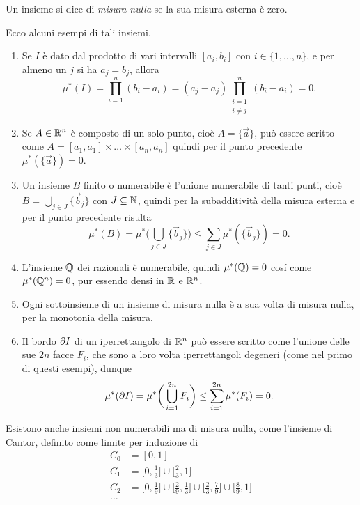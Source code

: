 Un insieme si dice di \emph{misura nulla} se la sua misura esterna è zero.
\begin{esempio} \label{es:insiemi-misura-nulla}
	Ecco alcuni esempi di tali insiemi.
	\begin{enumerate}
		\item Se $I$ è dato dal prodotto di vari intervalli $[a_i,b_i]$ con $i\in\{1,\dots,n\}$, e per almeno un $j$ si ha $a_j=b_j$, allora
			\begin{equation}
				\mu^*(I)=\prod_{i=1}^n(b_i-a_i)=(a_j-a_j)\prod_{\substack{i=1\\i\neq j}}^n(b_i-a_i)=0.
			\end{equation}
		\item Se $A\in\mathbb{R}^n$ è composto di un solo punto, cioè $A=\{\vec a\}$, può essere scritto come $A=[a_1,a_1]\times\dots\times[a_n,a_n]$ quindi per il punto precedente $\mu^*(\{\vec a\})=0$.
		\item Un insieme $B$ finito o numerabile è l'unione numerabile di tanti punti, cioè $B=\bigcup_{j\in J}\{\vec b_j\}$ con $J\subseteq\mathbb{N}$, quindi per la subadditività della misura esterna e per il punto precedente risulta
			\begin{equation}
				\mu^*(B)=\mu^*\bigg(\bigcup_{j\in J}\{\vec b_j\}\bigg)\leq\sum_{j\in J}\mu^*(\{\vec b_j\})=0.
			\end{equation}
		\item L'insieme $\mathbb{Q}$ dei razionali è numerabile, quindi $\mu^*(\mathbb{Q})=0$ cos\'i come $\mu^*(\mathbb{Q}^n)=0$, pur essendo densi in $\mathbb{R}$ e $\mathbb{R}^n$.
		\item Ogni sottoinsieme di un insieme di misura nulla è a sua volta di misura nulla, per la monotonia della misura.
		\item Il bordo $\partial I$ di un iperrettangolo di $\mathbb{R}^n$ può essere scritto come l'unione delle sue $2n$ facce $F_i$, che sono a loro volta iperrettangoli degeneri (come nel primo di questi esempi), dunque
			\begin{equation}
				\mu^*(\partial I)=\mu^*\bigg(\bigcup_{i=1}^{2n} F_i\bigg)\leq\sum_{i=1}^{2n}\mu^*(F_i)=0.
			\end{equation}
	\end{enumerate}
\end{esempio}
Esistono anche insiemi non numerabili ma di misura nulla, come l'insieme di Cantor, definito come limite per induzione di
\begin{equation}
	\begin{aligned}
		C_0&=[0,1]\\
		C_1&=\Big[0,\frac13\Big]\cup\Big[\frac23,1\Big]\\
		C_2&=\Big[0,\frac19\Big]\cup\Big[\frac29,\frac13\Big]\cup\Big[\frac23,\frac79\Big]\cup\Big[\frac89,1\Big]\\
		\dots
	\end{aligned}
\end{equation}

